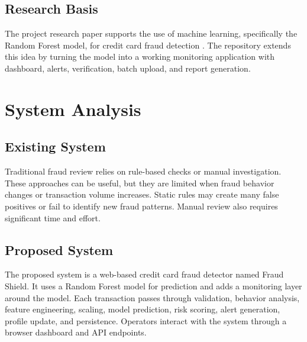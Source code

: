\documentclass[12pt,a4paper]{report}
\begin{document}
\section{Research Basis}
The project research paper supports the use of machine learning, specifically the Random Forest model, for credit card fraud detection \cite{shah2025}. The repository extends this idea by turning the model into a working monitoring application with dashboard, alerts, verification, batch upload, and report generation.

\chapter{System Analysis}

\section{Existing System}
Traditional fraud review relies on rule-based checks or manual investigation. These approaches can be useful, but they are limited when fraud behavior changes or transaction volume increases. Static rules may create many false positives or fail to identify new fraud patterns. Manual review also requires significant time and effort.

\section{Proposed System}
The proposed system is a web-based credit card fraud detector named Fraud Shield. It uses a Random Forest model for prediction and adds a monitoring layer around the model. Each transaction passes through validation, behavior analysis, feature engineering, scaling, model prediction, risk scoring, alert generation, profile update, and persistence. Operators interact with the system through a browser dashboard and API endpoints.
\end{document}
